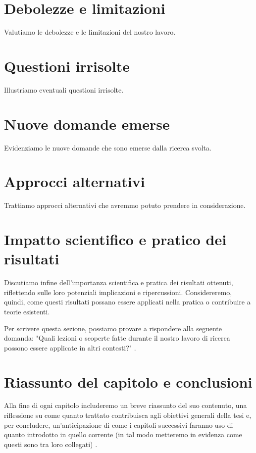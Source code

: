 \section{Debolezze e limitazioni}

Valutiamo le debolezze e le limitazioni del nostro lavoro.

\section{Questioni irrisolte}

Illustriamo eventuali questioni irrisolte.

\section{Nuove domande emerse}

Evidenziamo le nuove domande che sono emerse dalla ricerca svolta.

\section{Approcci alternativi}

Trattiamo approcci alternativi che avremmo potuto prendere in considerazione.

\section{Impatto scientifico e pratico dei risultati}

Discutiamo infine dell'importanza scientifica e pratica dei risultati ottenuti, riflettendo sulle loro potenziali implicazioni e ripercussioni. Considereremo, quindi, come questi risultati possano essere applicati nella pratica o contribuire a teorie esistenti.

\medskip

Per scrivere questa sezione, possiamo provare a rispondere alla seguente domanda: "Quali lezioni o scoperte fatte durante il nostro lavoro di ricerca possono essere applicate in altri contesti?" \cite{mannisto2022guide}.

\section{Riassunto del capitolo e conclusioni}

Alla fine di ogni capitolo includeremo un breve riassunto del suo contenuto, una riflessione su come quanto trattato contribuisca agli obiettivi generali della tesi e, per concludere, un'anticipazione di come i capitoli successivi faranno uso di quanto introdotto in quello corrente (in tal modo metteremo in evidenza come questi sono tra loro collegati) \cite{zobel2015writing}.